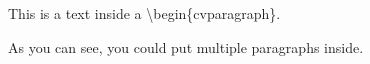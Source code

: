 




	


	





\begin{cvparagraph}

This is a text inside a {\backslash}begin\{cvparagraph\}.

As you can see, you could put multiple paragraphs inside.

\end{cvparagraph}

